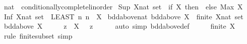 \begin{isabellebody}
\endisatagproof
{\isafoldproof}%
%
\isadelimproof
\isanewline
%
\endisadelimproof
\isanewline
{}\isamarkupfalse%
\isanewline
\isanewline
{}\isamarkupfalse%
\ nat\ {\isacharcolon}{\kern0pt}{\isacharcolon}{\kern0pt}\ conditionally{\isacharunderscore}{\kern0pt}complete{\isacharunderscore}{\kern0pt}linorder\isanewline
{}\isanewline
\isanewline
{}\isamarkupfalse%
\ {\isachardoublequoteopen}Sup\ {\isacharparenleft}{\kern0pt}X{\isacharcolon}{\kern0pt}{\isacharcolon}{\kern0pt}nat\ set{\isacharparenright}{\kern0pt}\ {\isacharequal}{\kern0pt}\ {\isacharparenleft}{\kern0pt}if\ X{\isacharequal}{\kern0pt}{\isacharbraceleft}{\kern0pt}{\isacharbraceright}{\kern0pt}\ then\ {}\ else\ Max\ X{\isacharparenright}{\kern0pt}{\isachardoublequoteclose}\isanewline
{}\isamarkupfalse%
\ {\isachardoublequoteopen}Inf\ {\isacharparenleft}{\kern0pt}X{\isacharcolon}{\kern0pt}{\isacharcolon}{\kern0pt}nat\ set{\isacharparenright}{\kern0pt}\ {\isacharequal}{\kern0pt}\ {\isacharparenleft}{\kern0pt}LEAST\ n{\isachardot}{\kern0pt}\ n\ {\isasymin}\ X{\isacharparenright}{\kern0pt}{\isachardoublequoteclose}\isanewline
\isanewline
{}\isamarkupfalse%
\ bdd{\isacharunderscore}{\kern0pt}above{\isacharunderscore}{\kern0pt}nat{\isacharcolon}{\kern0pt}\ {\isachardoublequoteopen}bdd{\isacharunderscore}{\kern0pt}above\ X\ {\isasymlongleftrightarrow}\ finite\ {\isacharparenleft}{\kern0pt}X{\isacharcolon}{\kern0pt}{\isacharcolon}{\kern0pt}nat\ set{\isacharparenright}{\kern0pt}{\isachardoublequoteclose}\isanewline
%
\isadelimproof
%
\endisadelimproof
%
\isatagproof
{}\isamarkupfalse%
\isanewline
\ \ \isamarkupfalse%
\ {\isachardoublequoteopen}bdd{\isacharunderscore}{\kern0pt}above\ X{\isachardoublequoteclose}\isanewline
\ \ \isamarkupfalse%
\ \isamarkupfalse%
\ z\ \ {\isachardoublequoteopen}X\ {\isasymsubseteq}\ {\isacharbraceleft}{\kern0pt}{\isachardot}{\kern0pt}{\isachardot}{\kern0pt}\ z{\isacharbraceright}{\kern0pt}{\isachardoublequoteclose}\isanewline
\ \ \ \ \isamarkupfalse%
\ {\isacharparenleft}{\kern0pt}auto\ simp{\isacharcolon}{\kern0pt}\ bdd{\isacharunderscore}{\kern0pt}above{\isacharunderscore}{\kern0pt}def{\isacharparenright}{\kern0pt}\isanewline
\ \ \isamarkupfalse%
\ \isamarkupfalse%
\ {\isachardoublequoteopen}finite\ X{\isachardoublequoteclose}\isanewline
\ \ \ \ \isamarkupfalse%
\ {\isacharparenleft}{\kern0pt}rule\ finite{\isacharunderscore}{\kern0pt}subset{\isacharparenright}{\kern0pt}\ simp\isanewline

\end{isabellebody}
